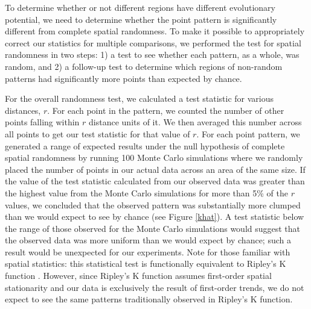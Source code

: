 To determine whether or not different regions have different evolutionary potential, we need to determine whether the point pattern is significantly different from complete spatial randomness. To make it possible to appropriately correct our statistics for multiple comparisons, we performed the test for spatial randomness in two steps: 1) a test to see whether each pattern, as a whole, was random, and 2) a follow-up test to determine which regions of non-random patterns had significantly more points than expected by chance. 

For the overall randomness test, we calculated a test statistic for various distances, $r$. For each point in the pattern, we counted the number of other points falling within $r$ distance units of it. We then averaged this number across all points to get our test statistic for that value of $r$. For each point pattern, we generated a range of expected results under the null hypothesis of complete spatial randomness by running 100 Monte Carlo simulations where we randomly placed the number of points in our actual data across an area of the same size. If the value of the test statistic calculated from our observed data was greater than the highest value from the Monte Carlo simulations for more than 5\% of the $r$ values, we concluded that the observed pattern was substantially more clumped than we would expect to see by chance (see Figure \ref{khat}). A test statistic below the range of those observed for the Monte Carlo simulations would suggest that the observed data was more uniform than we would expect by chance; such a result would be unexpected for our experiments. Note for those familiar with spatial statistics: this statistical test is functionally equivalent to Ripley's K function \citep{ripley_mapped_1981}. However, since Ripley's K function assumes first-order spatial stationarity and our data is exclusively the result of first-order trends, we do not expect to see the same patterns traditionally observed in Ripley's K function.

